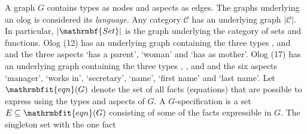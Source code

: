 A graph $G$ contains types as nodes and aspects as edges.
The graphs underlying an olog is considered its {\em language}.
Any category $\mathcal{C}$ has an underlying graph $|\mathcal{C}|$.
In particular, 
$|\mathrmbf{Set}|$ is the graph underlying the category of sets and functions.
Olog (12) has an underlying graph containing the three types ,  and  
and the three aspects `has a parent', `woman' and `has as mother'.
Olog (17) has an underlying graph containing the three types , , and  
and the six aspects `manager', `works in', `secretary', `name', `first name' and `last name'.
Let $\mathrmbfit{eqn}(G)$ denote the set of all facts (equations) 
that are possible to express using the types and aspects of $G$.
A $G$-specification
is a set $E \subseteq \mathrmbfit{eqn}(G)$ consisting of some of the facts expressible in $G$.
The singleton set with the one fact 
